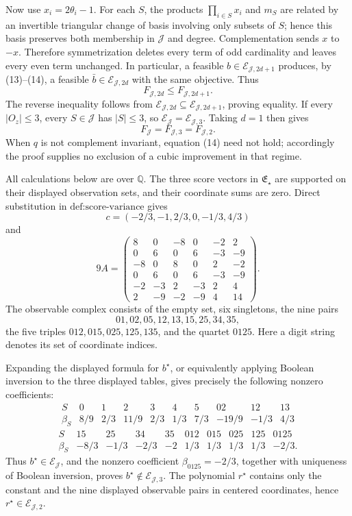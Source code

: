 Now use \(x_i=2\theta_i-1\).  For each \(S\), the products
\(\prod_{i\in S}x_i\) and \(m_S\) are related by an invertible triangular change of basis involving only subsets of \(S\); hence this basis preserves both membership in \(\mathcal J\) and degree.  Complementation sends \(x\) to \(-x\).  Therefore symmetrization deletes every term of odd cardinality and leaves every even term unchanged.  In particular, a feasible \(b\in\mathcal E_{\mathcal J,2d+1}\) produces, by (13)--(14), a feasible \(\bar b\in\mathcal E_{\mathcal J,2d}\) with the same objective.  Thus
\[
 F_{\mathcal J,2d}\le F_{\mathcal J,2d+1}.
\]
The reverse inequality follows from \(\mathcal E_{\mathcal J,2d}\subseteq\mathcal E_{\mathcal J,2d+1}\), proving equality.  If every \(|O_z|\le3\), every \(S\in\mathcal J\) has \(|S|\le3\), so \(\mathcal E_{\mathcal J}=\mathcal E_{\mathcal J,3}\).  Taking \(d=1\) then gives
\[
 F_{\mathcal J}=F_{\mathcal J,3}=F_{\mathcal J,2}.
\]
When \(q\) is not complement invariant, equation (14) need not hold; accordingly the proof supplies no exclusion of a cubic improvement in that regime.

All calculations below are over \(\mathbb Q\).  The three score vectors in \(\mathfrak E_\star\) are supported on their displayed observation sets, and their coordinate sums are zero.  Direct substitution in \(\text{def:score-variance}\) gives
\[
 c=(-2/3,-1,2/3,0,-1/3,4/3)
\]
and
\[
 9A=\begin{pmatrix}
 8&0&-8&0&-2&2\\
 0&6&0&6&-3&-9\\
 -8&0&8&0&2&-2\\
 0&6&0&6&-3&-9\\
 -2&-3&2&-3&2&4\\
 2&-9&-2&-9&4&14
 \end{pmatrix}. \tag{15}
\]
The observable complex consists of the empty set, six singletons, the nine pairs
\[
 01,02,05,12,13,15,25,34,35,
\]
the five triples \(012,015,025,125,135\), and the quartet \(0125\).  Here a digit string denotes its set of coordinate indices.

Expanding the displayed formula for \(b^\star\), or equivalently applying Boolean inversion to the three displayed tables, gives precisely the following nonzero coefficients:
\[
\begin{array}{c|rrrrrrrrr}
S&0&1&2&3&4&5&02&12&13\\ \hline
\beta_S&8/9&2/3&11/9&2/3&1/3&7/3&-19/9&-1/3&4/3
\end{array}
\]
\[
\begin{array}{c|rrrrrrrrr}
S&15&25&34&35&012&015&025&125&0125\\ \hline
\beta_S&-8/3&-1/3&-2/3&-2&1/3&1/3&1/3&1/3&-2/3.
\end{array} \tag{16}
\]
Thus \(b^\star\in\mathcal E_{\mathcal J}\), and the nonzero coefficient \(\beta_{0125}=-2/3\), together with uniqueness of Boolean inversion, proves \(b^\star\notin\mathcal E_{\mathcal J,3}\).  The polynomial \(r^\star\) contains only the constant and the nine displayed observable pairs in centered coordinates, hence \(r^\star\in\mathcal E_{\mathcal J,2}\).

